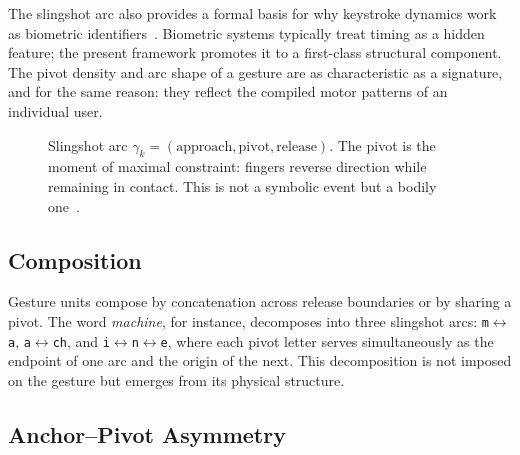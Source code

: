 \documentclass[11pt, a4paper]{article}
\begin{document}
The slingshot arc also provides a formal basis for why keystroke dynamics
work as biometric identifiers~\cite{monrose2000,gunetti2005}. Biometric
systems typically treat timing as a hidden feature; the present framework
promotes it to a first-class structural component. The pivot density and
arc shape of a gesture are as characteristic as a signature, and for the
same reason: they reflect the compiled motor patterns of an individual
user.

\begin{figure}[h]
\centering
{}
\caption{Slingshot arc $\gamma_k = (\mathrm{approach}, \mathrm{pivot}, \mathrm{release})$.
The pivot is the moment of maximal constraint: fingers reverse direction while
remaining in contact. This is not a symbolic event but a bodily one~\cite{cox2016}.}
\label{fig:slingshot}
\end{figure}

\subsection{Composition}

Gesture units compose by concatenation across release boundaries or by
sharing a pivot. The word \emph{machine}, for instance, decomposes into
three slingshot arcs: \texttt{m}$\leftrightarrow$\texttt{a},
\texttt{a}$\leftrightarrow$\texttt{ch}, and
\texttt{i}$\leftrightarrow$\texttt{n}$\leftrightarrow$\texttt{e}, where
each pivot letter serves simultaneously as the endpoint of one arc and
the origin of the next. This decomposition is not imposed on the gesture
but emerges from its physical structure.

\subsection{Anchor--Pivot Asymmetry}
\end{document}
